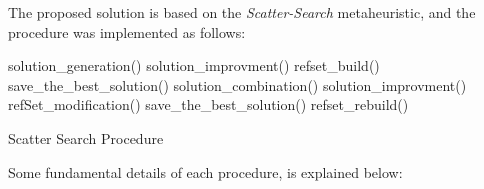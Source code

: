 The proposed solution is based on the \emph{Scatter-Search} metaheuristic,
and the procedure was implemented as follows:

\begin{scriptsize}
\begin{algorithm}
    \begin{algorithmic}
        \STATE solution\_generation()
        \STATE solution\_improvment()
        \STATE refset\_build()
        \STATE save\_the\_best\_solution()
        \REPEAT
                \STATE solution\_combination()
                \STATE solution\_improvment()
                \STATE refSet\_modification()
            \ENDWHILE
            \STATE save\_the\_best\_solution()
            \STATE refset\_rebuild()
    \end{algorithmic}
    \caption{Scatter Search Procedure}
\end{algorithm}
\end{scriptsize}

Some fundamental details of each procedure,
is explained below:

